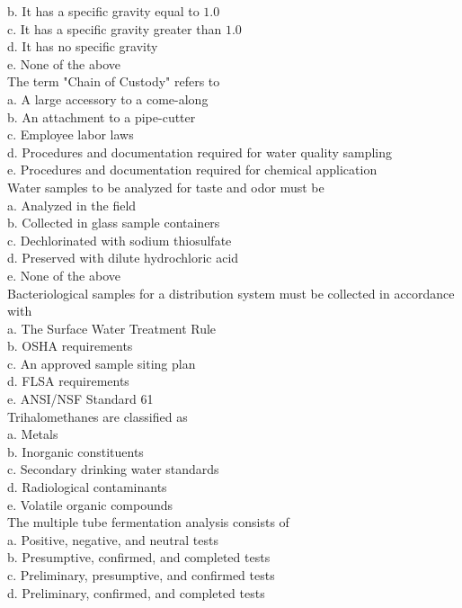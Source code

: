 b. It has a specific gravity equal to $1.0$\\
c. It has a specific gravity greater than $1.0$\\
d. It has no specific gravity\\
e. None of the above\\
  The term "Chain of Custody" refers to\\
a. A large accessory to a come-along\\
b. An attachment to a pipe-cutter\\
c. Employee labor laws\\
d. Procedures and documentation required for water quality sampling\\
e. Procedures and documentation required for chemical application\\
  Water samples to be analyzed for taste and odor must be\\
a. Analyzed in the field\\
b. Collected in glass sample containers\\
c. Dechlorinated with sodium thiosulfate\\
d. Preserved with dilute hydrochloric acid\\
e. None of the above\\
  Bacteriological samples for a distribution system must be collected in accordance with\\
a. The Surface Water Treatment Rule\\
b. OSHA requirements\\
c. An approved sample siting plan\\
d. FLSA requirements\\
e. ANSI/NSF Standard 61\\
  Trihalomethanes are classified as\\
a. Metals\\
b. Inorganic constituents\\
c. Secondary drinking water standards\\
d. Radiological contaminants\\
e. Volatile organic compounds\\
 The multiple tube fermentation analysis consists of\\
a. Positive, negative, and neutral tests\\
b. Presumptive, confirmed, and completed tests\\
c. Preliminary, presumptive, and confirmed tests\\
d. Preliminary, confirmed, and completed tests\\
